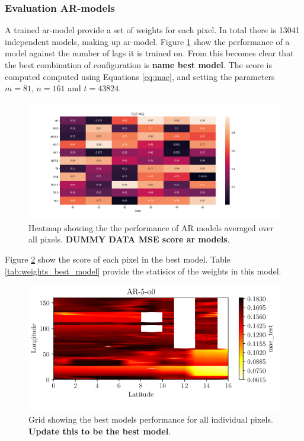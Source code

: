 \subsubsection{Evaluation AR-models}
A trained \acrshort{ar}-model provide a set of weights for each pixel. In total there is 13041 independent models, making up \acrshort{ar}-model. Figure \ref{fig:results_ar_models} show the performance of a model against the number of lags it is trained on. From this becomes clear that the best combination of configuration is \textbf{name best model}. The score is computed computed using Equations \eqref{eq:mae}, and setting the parameters $m = 81$, $n=161$ and $t=43824$.
\begin{figure}
    \centering
    \includegraphics[scale = 0.5]{python_figs/MSE_score_AR_models.png} %
    \caption{Heatmap showing the the performance of AR models averaged over all pixels. \textbf{DUMMY DATA MSE score ar models}.}
    \label{fig:results_ar_models}
\end{figure}
Figure \ref{fig:grid_mse_best_model} show the score of each pixel in the best model. Table \ref{tab:weights_best_model} provide the statisics of the weights in this model.
\begin{figure}
    \centering
    \includegraphics{python_figs/status_AR/AR-5-o0_mae_test.png}
    \caption{Grid showing the best models performance for all individual pixels. \textbf{Update this to be the best model}.}
    \label{fig:grid_mse_best_model}
\end{figure}

